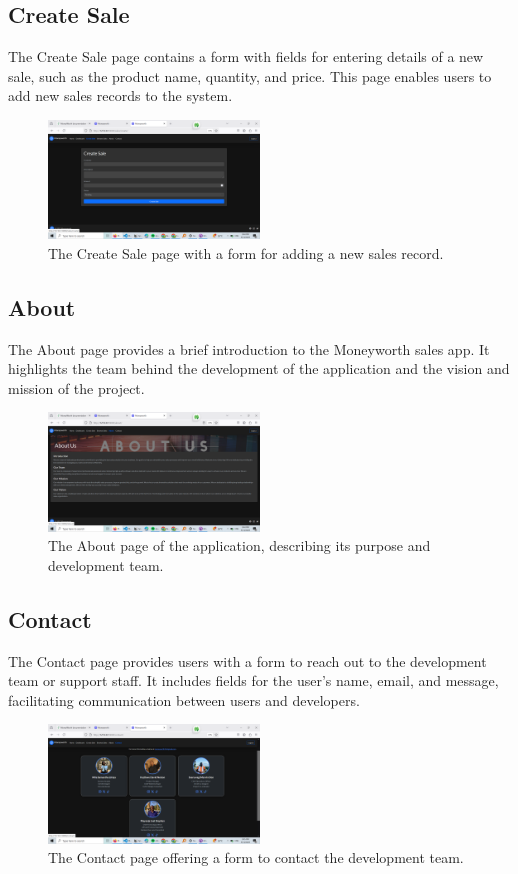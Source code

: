 \documentclass[12pt]{article}
\begin{document}
\subsection{Create Sale}
The Create Sale page contains a form with fields for entering details of a new sale, 
such as the product name, quantity, and price. This page enables users to add new sales 
records to the system.
\begin{figure}[H]
    \centering
    \includegraphics[width=0.5\textwidth]{create_sales.png}
    \caption{The Create Sale page with a form for adding a new sales record.}
\end{figure}

\subsection{About}
The About page provides a brief introduction to the Moneyworth sales app. 
It highlights the team behind the development of the application and the 
vision and mission of the project.
\begin{figure}[H]
    \centering
    \includegraphics[width=0.5\textwidth]{about_us.png}
    \caption{The About page of the application, describing its purpose and development team.}
\end{figure}

\subsection{Contact}
The Contact page provides users with a form to reach out to the development team or support staff. 
It includes fields for the user's name, email, and message, facilitating communication between users
 and developers.
\begin{figure}[H]
    \centering
    \includegraphics[width=0.5\textwidth]{contact_us.png}
    \caption{The Contact page offering a form to contact the development team.}
\end{figure}
\end{document}
